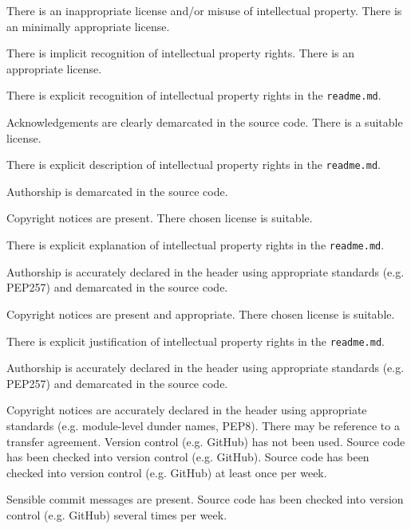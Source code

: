 \documentclass{../../fal_assignment}
\begin{document}
\begin{markingrubric}
        \grade\fail There is an inappropriate license and/or misuse of intellectual property.
        \grade There is an minimally appropriate license.
            \par There is implicit recognition of intellectual property rights.
        \grade There is an appropriate license. 
            \par There is explicit recognition of intellectual property rights in the \texttt{readme.md}.
            \par Acknowledgements are clearly demarcated in the source code.
        \grade There is a suitable license.
            \par There is explicit description of intellectual property rights in the \texttt{readme.md}.
            \par Authorship is demarcated in the source code.
            \par Copyright notices are present.
        \grade There chosen license is suitable. 
            \par There is explicit explanation of intellectual property rights in the \texttt{readme.md}.
            \par Authorship is accurately declared in the header using appropriate standards (e.g. PEP257) and demarcated in the source code.
            \par Copyright notices are present and appropriate.
        \grade There chosen license is suitable.
            \par There is explicit justification of intellectual property rights in the \texttt{readme.md}.
            \par Authorship is accurately declared in the header using appropriate standards (e.g. PEP257) and demarcated in the source code.
            \par Copyright notices are accurately declared in the header using appropriate standards (e.g. module-level dunder names, PEP8). There may be reference to a transfer agreement.
%
        \grade\fail Version control (e.g. GitHub) has not been used.
        \grade Source code has been checked into version control (e.g. GitHub).
        \grade Source code has been checked into version control (e.g. GitHub) at least once per week.
            \par Sensible commit messages are present.
        \grade Source code  has been checked into version control (e.g. GitHub) several times per week.

\end{markingrubric}
\end{document}
